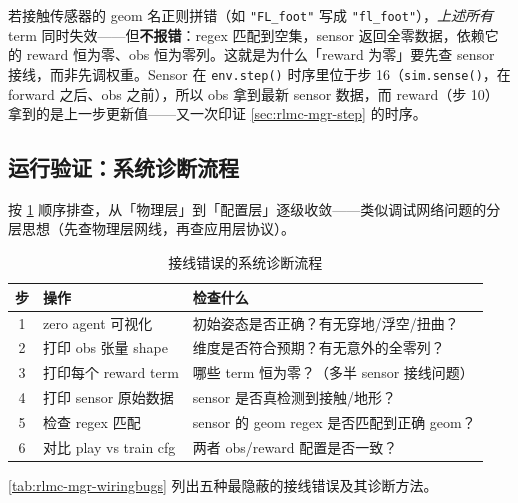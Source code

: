 \begin{insight}\label{ins:rlmc-mgr-wiring}
若接触传感器的 geom 名正则拼错（如 \verb|"FL_foot"| 写成 \verb|"fl_foot"|），\emph{上述所有} term 同时失效——但\textbf{不报错}：regex 匹配到空集，sensor 返回全零数据，依赖它的 reward 恒为零、obs 恒为零列。这就是为什么「reward 为零」要先查 sensor 接线，而非先调权重。Sensor 在 \verb|env.step()| 时序里位于步 16（\verb|sim.sense()|，在 forward 之后、obs 之前），所以 obs 拿到最新 sensor 数据，而 reward（步 10）拿到的是上一步更新值——又一次印证 \cref{sec:rlmc-mgr-step} 的时序。
\end{insight}

\subsection{运行验证：系统诊断流程}

按 \cref{tab:rlmc-mgr-diag} 顺序排查，从「物理层」到「配置层」逐级收敛——类似调试网络问题的分层思想（先查物理层网线，再查应用层协议）。

\begin{table}[ht]
\centering
\caption{接线错误的系统诊断流程}
\label{tab:rlmc-mgr-diag}
\small
\begin{tabular}{@{}cll@{}}
\toprule
步 & 操作 & 检查什么 \\
\midrule
1 & zero agent 可视化 & 初始姿态是否正确？有无穿地/浮空/扭曲？ \\
2 & 打印 obs 张量 shape & 维度是否符合预期？有无意外的全零列？ \\
3 & 打印每个 reward term & 哪些 term 恒为零？（多半 sensor 接线问题） \\
4 & 打印 sensor 原始数据 & sensor 是否真检测到接触/地形？ \\
5 & 检查 regex 匹配 & sensor 的 geom regex 是否匹配到正确 geom？ \\
6 & 对比 play vs train cfg & 两者 obs/reward 配置是否一致？ \\
\bottomrule
\end{tabular}
\end{table}

\cref{tab:rlmc-mgr-wiringbugs} 列出五种最隐蔽的接线错误及其诊断方法。

